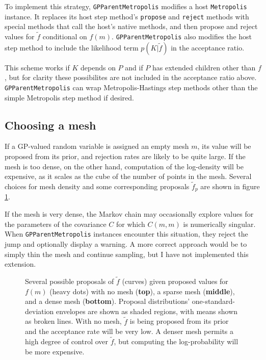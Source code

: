 \documentclass{report}
\begin{document}
To implement this strategy, \texttt{GPParentMetropolis} modifies a host \texttt{Metropolis} instance. It replaces its host step method's \texttt{propose} and \texttt{reject} methods with special methods that call the host's native methods, and then propose and reject values for $\tilde f$ conditional on $f(m)$. \texttt{GPParentMetropolis} also modifies the host step method to include the likelihood term $p(K|\tilde f)$ in the acceptance ratio.

This scheme works if $K$ depends on $P$ and if $P$ has extended children other than $f$, but for clarity these possibilites are not included in the acceptance ratio above. \texttt{GPParentMetropolis} can wrap Metropolis-Hastings step methods other than the simple Metropolis step method if desired.

\subsection{Choosing a mesh} If a GP-valued random variable is assigned an empty mesh $m$, its value will be proposed from its prior, and rejection rates are likely to be quite large. If the mesh is too dense, on the other hand, computation of the log-density will be expensive, as it scales as the cube of the number of points in the mesh. Several choices for mesh density and some corresponding proposals $\tilde f_p$ are shown in figure \ref{fig:meshpropose}. 

If the mesh is very dense, the Markov chain may occasionally explore values for the parameters of the covariance $C$ for which $C(m,m)$ is numerically singular. When \texttt{GPParentMetropolis} instances encounter this situation, they reject the jump and optionally display a warning. A more correct approach would be to simply thin the mesh and continue sampling, but I have not implemented this extension.

\begin{figure}
    \centering
    \caption{Several possible proposals of $\tilde f$ (curves) given proposed values for $f(m)$ (heavy dots) with no mesh (\textbf{top}), a sparse mesh (\textbf{middle}), and a dense mesh (\textbf{bottom}). Proposal distributions' one-standard-deviation envelopes are shown as shaded regions, with means shown as broken lines. With no mesh, $\tilde f$ is being proposed from its prior and the acceptance rate will be very low. A denser mesh permits a high degree of control over $\tilde f$, but computing the log-probability will be more expensive.}
    \label{fig:meshpropose}
\end{figure}
\end{document}
